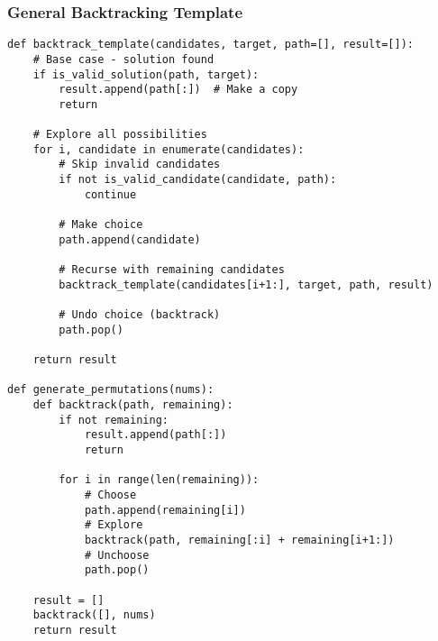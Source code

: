 \documentclass[10pt,a4paper]{article}
\begin{document}
\subsubsection{General Backtracking Template}
\begin{lstlisting}
def backtrack_template(candidates, target, path=[], result=[]):
    # Base case - solution found
    if is_valid_solution(path, target):
        result.append(path[:])  # Make a copy
        return

    # Explore all possibilities
    for i, candidate in enumerate(candidates):
        # Skip invalid candidates
        if not is_valid_candidate(candidate, path):
            continue

        # Make choice
        path.append(candidate)

        # Recurse with remaining candidates
        backtrack_template(candidates[i+1:], target, path, result)

        # Undo choice (backtrack)
        path.pop()

    return result

def generate_permutations(nums):
    def backtrack(path, remaining):
        if not remaining:
            result.append(path[:])
            return

        for i in range(len(remaining)):
            # Choose
            path.append(remaining[i])
            # Explore
            backtrack(path, remaining[:i] + remaining[i+1:])
            # Unchoose
            path.pop()

    result = []
    backtrack([], nums)
    return result
\end{lstlisting}
\end{document}
